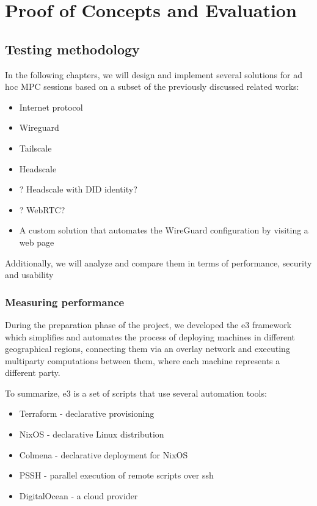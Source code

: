 \label{thesis__030-methods.md}
\part{Proof of Concepts and Evaluation}\label{thesis__030-methods.md__proof-of-concepts-and-evaluation}

\chapter{Testing methodology}\label{thesis__030-methods.md__testing-methodology}

In the following chapters, we will design and implement several solutions for ad hoc MPC sessions based on a subset of the previously discussed related works:

\begin{itemize}
\tightlist
\item
  Internet protocol
\item
  Wireguard
\item
  Tailscale
\item
  Headscale
\item
  ? Headscale with DID identity?
\item
  ? WebRTC?
\item
  A custom solution that automates the WireGuard configuration by visiting a web page
\end{itemize}

Additionally, we will analyze and compare them in terms of performance, security and usability

\section{Measuring performance}\label{thesis__030-methods.md__measuring-performance}

During the preparation phase of the project, we developed the \gls{e3} framework which simplifies and automates the process of deploying machines in different geographical regions, connecting them via an overlay network and executing multiparty computations between them, where each machine represents a different party.

To summarize, \gls{e3} is a set of scripts that use several automation tools:

\begin{itemize}
\tightlist
\item
  Terraform - declarative provisioning
\item
  NixOS - declarative Linux distribution
\item
  Colmena - declarative deployment for NixOS
\item
  PSSH - parallel execution of remote scripts over ssh
\item
  DigitalOcean - a cloud provider
\end{itemize}

